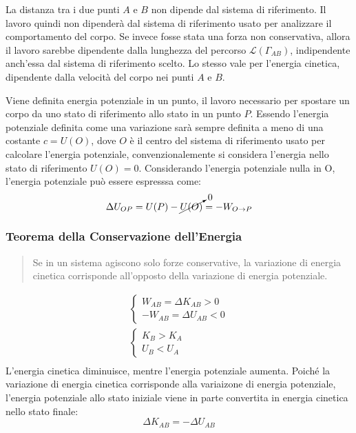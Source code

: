 \documentclass{article}
\numberwithin{equation}{subsection}
\begin{document}
La  distanza tra i due punti $A$ e $B$ non dipende dal sistema di 
riferimento. 
Il lavoro quindi non dipenderà dal sistema di riferimento usato per 
analizzare il comportamento del corpo. 
Se invece fosse stata una forza non conservativa, allora il 
lavoro sarebbe dipendente dalla lunghezza del percorso $\mathscr{L} (\Gamma_{AB})$, 
indipendente anch'essa dal sistema di riferimento scelto. 
Lo stesso vale per l'energia cinetica, dipendente dalla velocità 
del corpo nei punti $A$ e $B$.


Viene definita energia potenziale in un punto, il lavoro necessario per spostare un corpo da uno stato di riferimento allo stato in un punto $P$. Essendo l'energia potenziale 
definita come una variazione sarà sempre definita a meno di una costante $c=U(O)$, dove $O$ è il centro del sistema di riferimento usato per calcolare l'energia potenziale, 
convenzionalemente si considera l'energia nello stato di riferimento $U(O)=0$. Considerando l'energia potenziale nulla in O, l'energia potenziale può essere espresssa come: 
\begin{equation}
    \Delta U_{OP}=U(P)-\cancelto{0}{U(O)}=-W_{O\to P}
\end{equation} 

\subsubsection{Teorema della Conservazione dell'Energia}
\begin{quotation}
    Se in un sistema agiscono solo forze conservative, la variazione di energia cinetica corrisponde all'opposto della variazione di energia potenziale. 
\end{quotation}

\begin{gather*}
    \begin{cases}
       W_{AB}=\Delta K_{AB}>0\\
      -W_{AB}=\Delta U_{AB}<0
    \end{cases}\\
    \begin{cases}
        K_B>K_A\\
        U_B<U_A
     \end{cases}\\
\end{gather*}
L'energia cinetica diminuisce, mentre l'energia potenziale aumenta. Poiché la variazione di energia cinetica corrisponde alla variaizone di energia potenziale, l'energia 
potenziale allo stato iniziale viene in parte convertita in energia cinetica nello stato finale: 
\begin{equation}
    \Delta K_{AB}=-\Delta U_{AB}
\end{equation}
\end{document}
